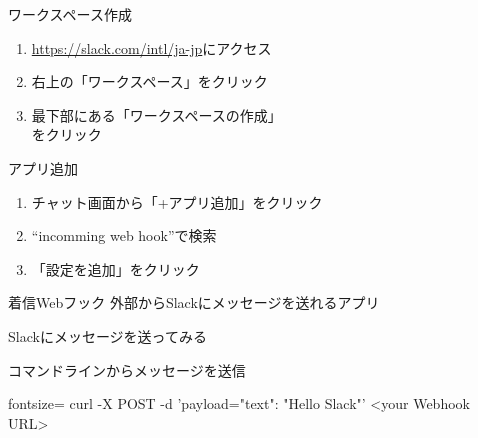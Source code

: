 \documentclass[dvipdfmx,xcolor={svgnames},aspectratio=169]{beamer}
\begin{document}
  \begin{frame}{ワークスペース作成}
    \begin{enumerate}\Large\setlength{\itemsep}{15pt}
      \item \url{https://slack.com/intl/ja-jp}にアクセス
      \item 右上の「ワークスペース」をクリック
      \item 最下部にある「ワークスペースの作成」 \\ をクリック
    \end{enumerate}
  \end{frame}
  \begin{frame}{アプリ追加}
    \begin{enumerate}\Large\setlength{\itemsep}{15pt}
      \item チャット画面から「+アプリ追加」をクリック
      \item ``incomming web hook''で検索
      \item 「設定を追加」をクリック
    \end{enumerate}
    \begin{block}{着信Webフック}
      外部からSlackにメッセージを送れるアプリ
    \end{block}
  \end{frame}
  \begin{frame}[fragile]{Slackにメッセージを送ってみる}
    \begin{exampleblock}{コマンドラインからメッセージを送信}
      \begin{GAS*}{fontsize=\Large}
curl -X POST -d
'payload={"text": "Hello Slack"}'
<your Webhook URL>
\end{GAS*}
    \end{exampleblock}
  \end{frame}
\end{document}
